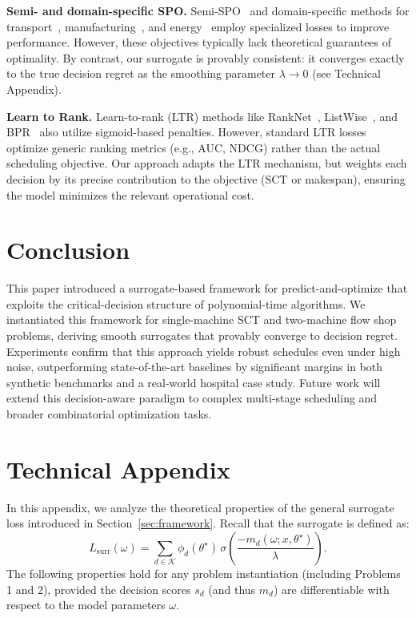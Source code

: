 \documentclass{article}
\begin{document}
\noindent\textbf{Semi- and domain-specific SPO.}
Semi-SPO~\cite{Yang2023Semi,Yan2020Semi} and domain-specific methods for transport~\cite{tian2023}, manufacturing~\cite{Wang2024Refinery}, and energy~\cite{Alrasheedi2024Microgrid} employ specialized losses to improve performance.
However, these objectives typically lack theoretical guarantees of optimality.
By contrast, our surrogate is provably consistent: it converges exactly to the true decision regret as the smoothing parameter $\lambda \to 0$ (see Technical Appendix).

\noindent\textbf{Learn to Rank.}
Learn-to-rank (LTR) methods like RankNet~\cite{burges2005learning}, ListWise~\cite{cao2007learning}, and BPR~\cite{rendle2009bpr} also utilize sigmoid-based penalties.
However, standard LTR losses optimize generic ranking metrics (e.g., AUC, NDCG) rather than the actual scheduling objective.
Our approach adapts the LTR mechanism, but weights each decision by its precise contribution to the objective (SCT or makespan), ensuring the model minimizes the relevant operational cost.

\section{Conclusion}
\label{sec:conclusion}

This paper introduced a surrogate-based framework for predict-and-optimize that exploits the critical-decision structure of polynomial-time algorithms.
We instantiated this framework for single-machine SCT and two-machine flow shop problems, deriving smooth surrogates that provably converge to decision regret.
Experiments confirm that this approach yields robust schedules even under high noise, outperforming state-of-the-art baselines by significant margins in both synthetic benchmarks and a real-world hospital case study.
Future work will extend this decision-aware paradigm to complex multi-stage scheduling and broader combinatorial optimization tasks.



\clearpage
\appendix
\newpage
\section{Technical Appendix}
\label{sec:appendix}

In this appendix, we analyze the theoretical properties of the general surrogate loss introduced in Section~\ref{sec:framework}.
Recall that the surrogate is defined as:
\[
L_{\mathrm{surr}}(\omega)
=
\sum_{d \in \mathcal{K}}
\phi_d(\theta^\star)\,
\sigma\!\left(
\frac{-m_d(\omega;x,\theta^\star)}{\lambda}
\right).
\]
The following properties hold for any problem instantiation (including Problems 1 and 2), provided the decision scores $s_d$ (and thus $m_d$) are differentiable with respect to the model parameters $\omega$.
\end{document}
